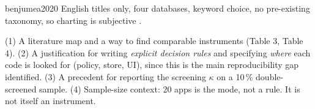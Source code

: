 \begin{papercard}{benjumea2020}
 English titles only, four databases, keyword choice, no pre-existing taxonomy, so charting is subjective .

 (1) A literature map and a way to find comparable instruments (Table 3, Table 4). (2) A justification for writing \emph{explicit decision rules} and specifying \emph{where} each code is looked for (policy, store, UI), since this is the main reproducibility gap identified. (3) A precedent for reporting the screening $\kappa$ on a 10\,\% double-screened sample. (4) Sample-size context: 20 apps is the mode, not a rule. It is not itself an instrument.
\end{papercard}
